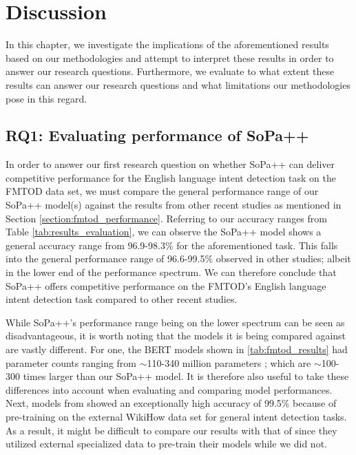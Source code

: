 \chapter{Discussion}

\label{chapter:discussion}

In this chapter, we investigate the implications of the aforementioned results
based on our methodologies and attempt to interpret these results in order to
answer our research questions. Furthermore, we evaluate to what extent these
results can answer our research questions and what limitations our methodologies
pose in this regard.

\section{RQ1: Evaluating performance of SoPa++}

In order to answer our first research question on whether SoPa++ can deliver
competitive performance for the English language intent detection task on the
FMTOD data set, we must compare the general performance range of our SoPa++
model(s) against the results from other recent studies as mentioned in Section
\ref{section:fmtod_performance}. Referring to our accuracy ranges from Table
\ref{tab:results_evaluation}, we can observe the SoPa++ model shows a general
accuracy range from 96.9-98.3$\%$ for the aforementioned task. This falls into
the general performance range of 96.6-99.5$\%$ observed in other studies; albeit
in the lower end of the performance spectrum. We can therefore conclude that
SoPa++ offers competitive performance on the FMTOD's English language intent
detection task compared to other recent studies.

While SoPa++'s performance range being on the lower spectrum can be seen as
disadvantageous, it is worth noting that the models it is being compared against
are vastly different. For one, the BERT models shown in
\ref{tab:fmtod_results} had parameter counts ranging from $\sim$110-340 million
parameters \citep{devlin-etal-2019-bert}; which are $\sim$100-300 times larger
than our SoPa++ model. It is therefore also useful to take these differences
into account when evaluating and comparing model performances. Next, models from
\citet{zhang-etal-2020-intent} showed an exceptionally high accuracy of
99.5$\%$ because of pre-training on the external WikiHow data set for general
intent detection tasks. As a result, it might be difficult to compare our
results with that of \citet{zhang-etal-2020-intent} since they utilized external
specialized data to pre-train their models while we did not.

